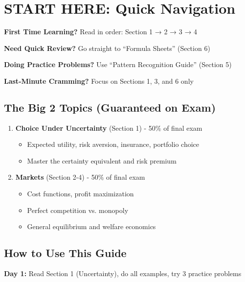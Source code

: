 \documentclass[10pt,letterpaper]{article}
\begin{document}
\section*{START HERE: Quick Navigation}

\begin{tcolorbox}[colback=yellow!20,colframe=orange!80,arc=3mm]
\textbf{First Time Learning?} Read in order: Section 1 → 2 → 3 → 4

\textbf{Need Quick Review?} Go straight to ``Formula Sheets'' (Section 6)

\textbf{Doing Practice Problems?} Use ``Pattern Recognition Guide'' (Section 5)

\textbf{Last-Minute Cramming?} Focus on Sections 1, 3, and 6 only
\end{tcolorbox}

\subsection*{The Big 2 Topics (Guaranteed on Exam)}

\begin{enumerate}[leftmargin=*]
  \item \textbf{Choice Under Uncertainty} (Section 1) - 50\% of final exam
    \begin{itemize}
      \item Expected utility, risk aversion, insurance, portfolio choice
      \item Master the certainty equivalent and risk premium
    \end{itemize}

  \item \textbf{Markets} (Section 2-4) - 50\% of final exam
    \begin{itemize}
      \item Cost functions, profit maximization
      \item Perfect competition vs. monopoly
      \item General equilibrium and welfare economics
    \end{itemize}
\end{enumerate}

\subsection*{How to Use This Guide}

\textbf{Day 1:} Read Section 1 (Uncertainty), do all examples, try 3 practice problems
\end{document}
